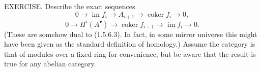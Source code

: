 EXERCISE. Describe the exact sequences
$$0\to\operatorname{im} f_i\to A_{i+1}\to\operatorname{coker} f_i\to0,$$
$$0\to H^i(A^\bullet)\to\operatorname{coker} f_{i-1}\to\operatorname{im} f_i\to0.$$
(These are somehow dual to (1.5.6.3). In fact, in some mirror universe this might have been given as the standard definition of homology.) Assume the category is that of modules over a fixed ring for convenience, but be aware that the result is true for any abelian category.
